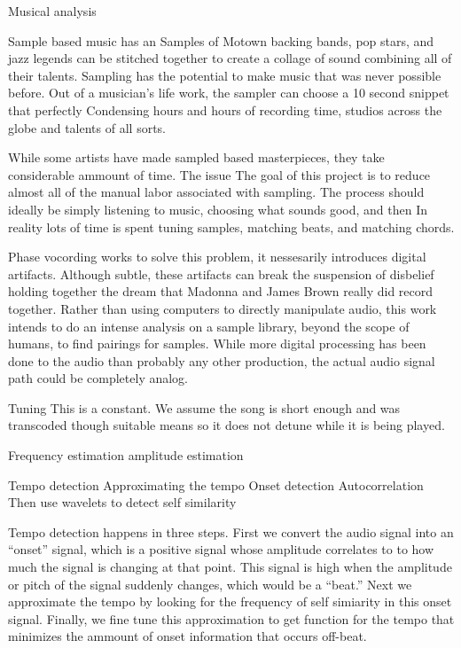 Musical analysis

Sample based music has an 
Samples of Motown backing bands, pop stars, and jazz legends can be stitched together to create a collage of sound combining all of their talents.
Sampling has the potential to make music that was never possible before.
Out of a musician's life work, the sampler can choose a 10 second snippet that perfectly
Condensing hours and hours of recording time, studios across the globe and talents of all sorts.

While some artists have made sampled based masterpieces, they take considerable ammount of time.
The issue
The goal of this project is to reduce almost all of the manual labor associated with sampling.
The process should ideally be simply listening to music, choosing what sounds good, and then
In reality lots of time is spent tuning samples, matching beats, and matching chords.

Phase vocording works to solve this problem, it nessesarily introduces digital artifacts.
Although subtle, these artifacts can break the suspension of disbelief holding together the dream that Madonna and James Brown really did record together.
Rather than using computers to directly manipulate audio, this work intends to do an intense analysis on a sample library, beyond the scope of humans, to find pairings for samples.
While more digital processing has been done to the audio than probably any other production, the actual audio signal path could be completely analog. 


Tuning
This is a constant. We assume the song is short enough and was transcoded though suitable means so it does not detune while it is being played. 

Frequency estimation
amplitude estimation

Tempo detection
Approximating the tempo
Onset detection
Autocorrelation
Then use wavelets to detect self similarity

Tempo detection happens in three steps.
First we convert the audio signal into an ``onset'' signal, which is a positive signal whose amplitude correlates to to how much the signal is changing at that point. This signal is high when the amplitude or pitch of the signal suddenly changes, which would be a ``beat.''
Next we approximate the tempo by looking for the frequency of self simiarity in this onset signal.
Finally, we fine tune this approximation to get function for the tempo that minimizes the ammount of onset information that occurs off-beat.

